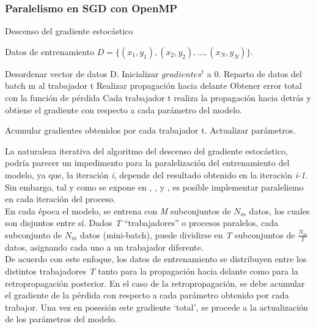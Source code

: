 \subsubsection{Paralelismo en SGD con OpenMP}
\begin{algorithm}[H]
	\caption{Descenso del gradiente estocástico} 
	\begin{algorithmic}
		\State Datos de entrenamiento $D=\{(x_1, y_1), (x_2, y_2), ..., (x_N, y_N)\}$.
		
			\State Desordenar vector de datos D.
					\State Inicializar $gradientes^t$ a 0.
					\State Reparto de datos del batch m al trabajador t
					\State Realizar propagación hacia delante
					\State Obtener error total con la función de pérdida
					\State Cada trabajador t realiza la propagación hacia 
					\State detrás y obtiene el gradiente con respecto a 
					\State cada parámetro del modelo.
					
					\State Acumular gradientes obtenidos por cada trabajador t.
					\State Actualizar parámetros.
					
				\EndFor
			\EndFor
		\EndFor
	\end{algorithmic}
\end{algorithm}

La naturaleza iterativa del algoritmo del descenso del gradiente estocástico, podría parecer un impedimento para la paralelización del entrenamiento del modelo, ya que, la iteración \textit{i}, depende del resultado obtenido en la iteración \textit{i-1}. Sin embargo, tal y como se expone en \cite{CNN_parallel_Stanford}, \cite{CNN_parallel_International_Conference}, y \cite{CNN_parallel_Ome_Weird_Trick}, es posible implementar paralelismo en cada iteración del proceso. \\
En cada época el modelo, se entrena con \textit{M} subconjuntos de $N_m$ datos, los cuales son disjuntos entre sí. Dados \textit{T} ``trabajadores'' o procesos paralelos, cada subconjunto de $N_m$ datos (mini-batch), puede dividirse en \textit{T} subconjuntos de $\frac{N_m}{T}$ datos, asignando cada uno a un trabajador diferente.\\
De acuerdo con este enfoque, los datos de entrenamiento se distribuyen entre los distintos trabajadores \textit{T} tanto para la propagación hacia delante como para la retropropagación posterior. En el caso de la retropropagación, se debe acumular el gradiente de la pérdida con respecto a cada parámetro obtenido por cada trabajor. Una vez en posesión este gradiente `total', se procede a la actualización de los parámetros del modelo.

